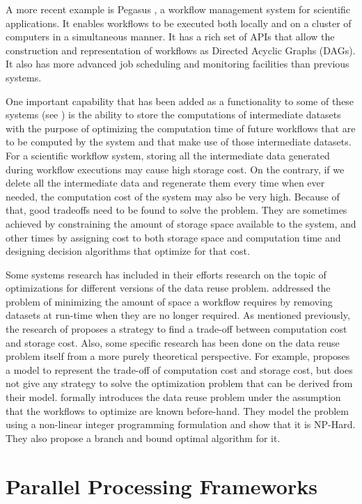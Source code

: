 A more recent example is Pegasus \citep{singh2008workflow}, a workflow management system for scientific applications.  It enables workflows to be executed both locally and on a cluster of computers in a simultaneous manner.  It has a rich set of APIs that allow the construction and representation of workflows as Directed Acyclic Graphs (DAGs).  It also has more advanced job scheduling and monitoring facilities than previous systems.  

One important capability that has been added as a functionality to some of these systems (see \cite{yuan2012data}) is the ability to store the computations of intermediate datasets with the purpose of optimizing the computation time of future workflows that are to be computed by the system and that make use of those intermediate datasets. For a scientific workflow system, storing all the intermediate data generated during workflow executions may cause high storage cost.  On the contrary, if we delete all the intermediate data and regenerate them every time when ever needed, the computation cost of the system may also be very high. Because of that, good tradeoffs need to be found to solve the problem.  They are sometimes achieved by constraining the amount of storage space available to the system, and other times by assigning cost to both storage space and computation time and designing decision algorithms that optimize for that cost. 

Some systems research has included in their efforts research on the topic of optimizations for different versions of the data reuse problem.  \cite{ramakrishnan2007scheduling} addressed the problem of minimizing the amount of space a workflow requires by removing datasets at run-time when they are no longer required.  As mentioned previously, the research of \cite{yuan2012data} proposes a strategy to find a trade-off between computation cost and storage cost. Also, some specific research has been done on the data reuse problem itself from a more purely theoretical perspective. For example, \cite{adams2009maximizing} proposes a model to represent the trade-off of computation cost and storage cost, but does not give any strategy to solve the optimization problem that can be derived from their model. \cite{zohrevandi2013bounded} formally introduces the data reuse problem under the assumption that the workflows to optimize are known before-hand. They model the problem using a non-linear integer programming formulation and show that  it is NP-Hard.  They also propose a branch and bound optimal algorithm for it.
\section{Parallel Processing Frameworks}

